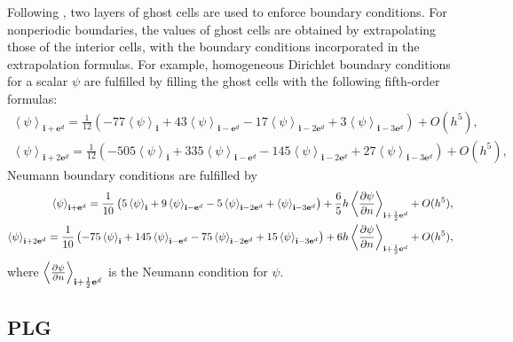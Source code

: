 Following \cite{zhang_fourth-order_2014}, two layers of ghost cells
are used to enforce boundary  
conditions.  For nonperiodic boundaries, the values of ghost cells are
obtained by extrapolating those of the interior cells, with the
boundary conditions incorporated in the extrapolation formulas. For
example, homogeneous Dirichlet boundary conditions for a scalar $\psi$
are fulfilled by filling the ghost cells with the following
fifth-order formulas:
\begin{equation}
  \label{eq:GhostedDiri}
  \begin{aligned}
    \left<\psi\right>_{\mathbf{i}+\mathbf{e}^d} = \frac{1}{12}\left(
      -77\left<\psi\right>_{\mathbf{i}} +
      43\left<\psi\right>_{\mathbf{i}-\mathbf{e}^d} -
      17\left<\psi\right>_{\mathbf{i}-2\mathbf{e}^d} +
      3\left<\psi\right>_{\mathbf{i}-3\mathbf{e}^d}\right) + O(h^5), \\
    \left<\psi\right>_{\mathbf{i}+2\mathbf{e}^d} = \frac{1}{12}\left(
      -505\left<\psi\right>_{\mathbf{i}} +
      335\left<\psi\right>_{\mathbf{i}-\mathbf{e}^d} -
      145\left<\psi\right>_{\mathbf{i}-2\mathbf{e}^d} +
      27\left<\psi\right>_{\mathbf{i}-3\mathbf{e}^d}\right) + O(h^5),
  \end{aligned}
\end{equation}
Neumann boundary conditions are fulfilled by
\begin{equation}
  \label{eq:GhostedNeumann}
  \begin{aligned}
    \left<\psi\right>_{\mathbf{i}+\mathbf{e}^d} = \frac{1}{10}\left(
      5\left<\psi\right>_{\mathbf{i}} +
      9\left<\psi\right>_{\mathbf{i}-\mathbf{e}^d} -
      5\left<\psi\right>_{\mathbf{i}-2\mathbf{e}^d} +
      \left<\psi\right>_{\mathbf{i}-3\mathbf{e}^d}\right) +
    \frac{6}{5}h\left<\frac{\partial \psi}{\partial n}\right>_{\mathbf{i}+\frac{1}{2}\mathbf{e}^d} + O(h^5), \\
    \left<\psi\right>_{\mathbf{i}+2\mathbf{e}^d} = \frac{1}{10}\left(
      -75\left<\psi\right>_{\mathbf{i}} +
      145\left<\psi\right>_{\mathbf{i}-\mathbf{e}^d} -
      75\left<\psi\right>_{\mathbf{i}-2\mathbf{e}^d} +
      15\left<\psi\right>_{\mathbf{i}-3\mathbf{e}^d}\right) +
    6h\left<\frac{\partial \psi}{\partial n}\right>_{\mathbf{i}+\frac{1}{2}\mathbf{e}^d}
    + O(h^5),
  \end{aligned}
\end{equation}
where
$\left<\frac{\partial \psi}{\partial n}\right>_{\mathbf{i}+\frac{1}{2}\mathbf{e}^d} $
is the Neumann condition for $\psi$. 

\subsection{PLG}
\label{sec:PLG}

